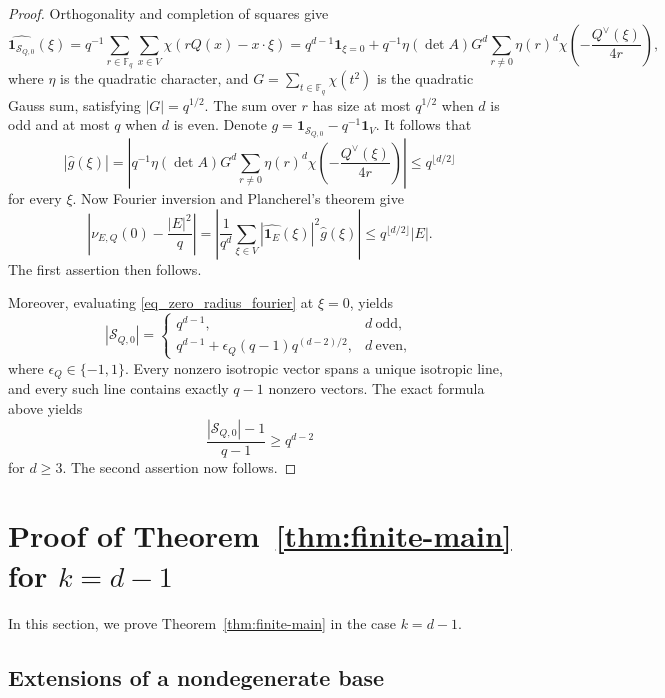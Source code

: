 \documentclass[11pt]{article}
\theoremstyle{remark}
\newcommand{\wh}{\widehat}
\numberwithin{equation}{section}
\newcommand{\Fq}{\mathbb F_q}
\newcommand{\1}{\mathbf 1}
\begin{document}
\begin{proof}
Orthogonality and completion of squares give
\begin{equation} \label{eq_zero_radius_fourier}
\wh{\1_{\mathcal S_{Q,0}}}(\xi) 
= q^{-1}\sum\limits_{r\in \Fq}\sum\limits_{x\in V}\chi(rQ(x)-x\cdot \xi)
= q^{d-1}\1_{\xi=0} + q^{-1}\eta(\det A)G^d
 \sum_{r\ne0}\eta(r)^d  \chi\!\left(-\frac{Q^\vee(\xi)}{4r}\right),
\end{equation}
where \(\eta\) is the quadratic character, and $G=\sum_{t\in\Fq}\chi(t^2)$ is the quadratic Gauss sum, satisfying \(|G|=q^{1/2}\). The sum over $r$ has size at most $q^{1/2}$ when $d$ is odd and at most $q$ when $d$ is even. Denote $g=\1_{\mathcal S_{Q,0}}-q^{-1}\1_V$. It follows that 
\[
|\wh{g}(\xi)| = \left|q^{-1}\eta(\det A)G^d
 \sum_{r\ne0}\eta(r)^d  \chi\!\left(-\frac{Q^\vee(\xi)}{4r}\right)\right| \leq q^{\lfloor d/2 \rfloor}
\]
for every $\xi$. Now Fourier inversion and Plancherel's theorem give
\[
 \left|\nu_{E,Q}(0) - \frac{|E|^2}{q}\right| = \left|
 \frac{1}{q^d}\sum_{\xi\in V}
 |\wh{\1_E}(\xi)|^2
 \wh{g}(\xi)\right|
 \le
 q^{\lfloor d/2\rfloor}|E|.
\]
The first assertion then follows. 

Moreover, evaluating \eqref{eq_zero_radius_fourier} at $\xi=0$, yields
\[
 |\mathcal S_{Q,0}|
 =
 \begin{cases}
 q^{d-1},&d\ \text{odd},\\
 q^{d-1}+\epsilon_Q(q-1)q^{(d-2)/2},&d\ \text{even},
 \end{cases}
\]
where \(\epsilon_Q\in\{-1,1\}\). 
Every nonzero isotropic vector spans a unique isotropic line, and every such line contains exactly $q-1$ nonzero vectors. The exact formula above yields
\[
\frac{|\mathcal S_{Q,0}|-1}{q-1} \ge q^{d-2}
\]
for \(d\ge3\). The second assertion now follows. 
\end{proof}

\section{Proof of Theorem~\ref{thm:finite-main} for \texorpdfstring{\(k=d-1\)}{k=d-1}}
\label{sec:codim-one-proof}

In this section, we prove Theorem~\ref{thm:finite-main} in the case
\(k=d-1\).



\subsection{Extensions of a nondegenerate base}
\end{document}
